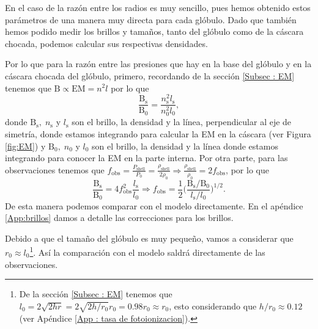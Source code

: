 \documentclass{book}
\begin{document}
En el caso de la razón entre los radios es muy sencillo, pues hemos obtenido estos parámetros de una manera muy directa para cada glóbulo.
Dado que también hemos podido medir los brillos y tamaños, tanto del glóbulo como de la cáscara chocada, podemos calcular sus respectivas densidades.

Por lo que para la razón entre las presiones que hay en la base del glóbulo y en la cáscara chocada del glóbulo, primero, recordando de la sección \ref{Subsec : EM} tenemos que $\mathrm{B}\propto \mathrm{EM}=n^2l$ por lo que
\begin{equation}
\frac{\mathrm{B_\mathrm{s}}}{\mathrm{B_0}}=\frac{n_\mathrm{s}^2l_\mathrm{s}}{n_0^2l_0},
\end{equation}
donde $\mathrm{B_\mathrm{s}}, \; n_\mathrm{s}$ y $l_\mathrm{s}$ son el brillo, la densidad y la línea, perpendicular al eje de simetría, donde estamos integrando para calcular la EM en la cáscara (ver Figura \ref{fig:EM}) y  $\mathrm{B_0}, \; n_0$ y $l_0$ son el brillo, la densidad y la línea donde estamos integrando para conocer la EM en la parte interna. Por otra parte, para las observaciones tenemos que $f_\mathrm{obs} = \frac{P_\mathrm{shell}}{P_0}=\frac{\rho_\mathrm{shell}}{2\rho_0} \Rightarrow \frac{\rho_\mathrm{shell}}{\rho_0}=2f_\mathrm{obs}$, por lo que
\begin{equation}
\frac{\mathrm{B_\mathrm{s}}}{\mathrm{B_0}}=4f_\mathrm{obs}^2\frac{l_\mathrm{s}}{l_0}\Rightarrow f_\mathrm{obs}= \frac{1}{2}\Big(\frac{\mathrm{B_\mathrm{s}}/\mathrm{B_0}}{l_\mathrm{s}/l_0}\Big)^{1/2}.
\end{equation}
De esta manera podemos comparar con el modelo directamente. En el apéndice \ref{App:brillos} damos a detalle las correcciones para los brillos.

Debido a que el tamaño del glóbulo es muy pequeño, vamos a considerar que $r_0\approx l_0$\footnote{De la sección \ref{Subsec : EM} tenemos que $l_0=2\sqrt{2hr}=2\sqrt{2h/r_0}r_0=0.98 r_0\approx r_0$, esto considerando que $h/r_0\approx0.12$ (ver Apéndice \ref{App : tasa de fotoionizacion}).}. Así la comparación con el modelo saldrá directamente de las observaciones. 
\end{document}
